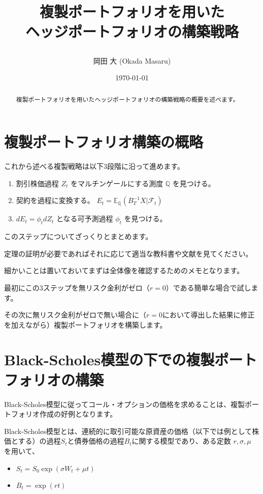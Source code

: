 \documentclass[uplatex,a4j,12pt,dvipdfmx]{jsarticle}
\title{
\begin{center}
複製ポートフォリオを用いた \\ ヘッジポートフォリオの構築戦略
\end{center}
}
\author{岡田 大 (Okada Masaru)}
\date{\today}
\begin{document}
\maketitle

\begin{abstract}
	複製ポートフォリオを用いたヘッジポートフォリオの構築戦略の概要を述べます。
\end{abstract}


\section{複製ポートフォリオ構築の概略}
これから述べる複製戦略は以下3段階に沿って進めます。
\begin{enumerate}
	\item 割引株価過程 $Z_{t}$ をマルチンゲールにする測度 $\mathbb{Q}$ を見つける。
	\item 契約を過程に変換する。 $E_{t} = \mathbb{E}_{\mathbb{Q}}(B^{-1}_{T} X | \mathcal{F}_{t})$
	\item $dE_{t} = \phi_{t} d Z_{t}$ となる可予測過程 $\phi_{t}$ を見つける。
\end{enumerate}

このステップについてざっくりとまとめます。

定理の証明が必要であればそれに応じて適当な教科書や文献を見てください。

細かいことは置いておいてまずは全体像を確認するためのメモとなります。

最初にこの3ステップを無リスク金利がゼロ（$r=0$）である簡単な場合で試します。

その次に無リスク金利がゼロで無い場合に（$r=0$において導出した結果に修正を加えながら）複製ポートフォリオを構築します。

\section{Black-Scholes模型の下での複製ポートフォリオの構築}

Black-Scholes模型に従ってコール・オプションの価格を求めることは、複製ポートフォリオ作成の好例となります。

Black-Scholes模型とは、連続的に取引可能な原資産の価格（以下では例として株価とする）の過程$S_{t}$と債券価格の過程$B_{t}$に関する模型であり、ある定数 $r, \sigma, \mu$ を用いて、

\begin{itemize}
	\item $S_{t} = S_{0} \exp (\sigma W_{t} + \mu t)$
	\item $B_{t} = \exp (rt)$
\end{itemize}
\end{document}
